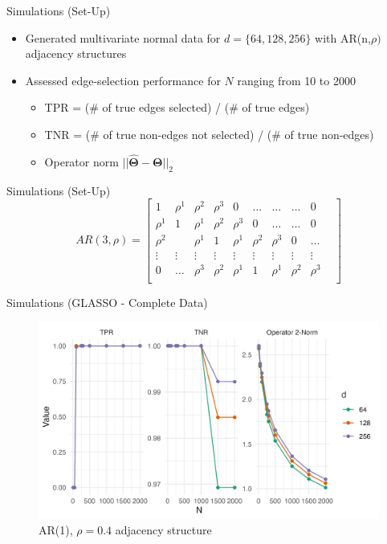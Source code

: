 \documentclass{beamer}
\begin{document}
\begin{frame}{Simulations (Set-Up)}
    \begin{itemize}\setlength\itemsep{8mm}
        \item Generated multivariate normal data for $d=\{64, 128, 256\}$ with AR(n,$\rho)$ adjacency structures
        \item Assessed edge-selection performance for $N$ ranging from 10 to 2000 
            \begin{itemize}
                \item TPR = (\# of true edges selected) / (\# of true edges)
                \item TNR = (\# of true non-edges not selected) / (\# of true non-edges)
                \item Operator norm $||\mathbf{\hat\Theta - \Theta}||_2$
            \end{itemize}
    \end{itemize}
\end{frame}


\begin{frame}{Simulations (Set-Up)}
    \[
    AR(3, \rho) = \begin{bmatrix}
        1 & \rho^1 & \rho^2 & \rho^3 &  0 & \dots & \dots & \dots & 0 \\
        \rho^1 & 1 & \rho^1 & \rho^2 & \rho^3 &  0 & \dots & \dots & 0 \\
        \rho^2 & & \rho^1 & 1 & \rho^1 & \rho^2 & \rho^3 & 0 & \dots\\
        \vdots &\vdots &\vdots &\vdots &\vdots &\vdots &\vdots &\vdots &\vdots &\\
        0 & \dots & \rho^3 & \rho^2 & \rho^1 & 1 & \rho^1 & \rho^2 & \rho^3 \\ 
    \end{bmatrix}
    \]
\end{frame}


\begin{frame}{Simulations (GLASSO - Complete Data)}
    \begin{figure}
        \centering 
        \includegraphics[scale=0.65]{glasso_complete_fixN_b1.png}
        \caption{AR(1), $\rho=0.4$ adjacency structure}
    \end{figure}
\end{frame}
\end{document}
